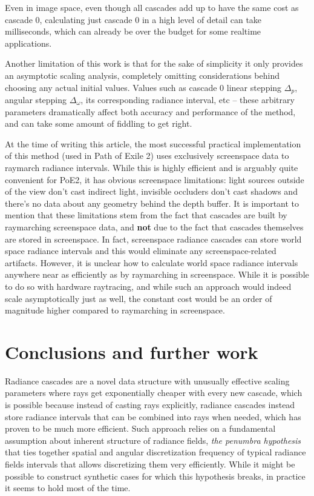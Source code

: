 \documentclass{jcgt}
\begin{document}
Even in image space, even though all cascades add up to have the same cost as cascade 0, calculating just cascade 0 in a high level of detail can take milliseconds, which can already be over the budget for some realtime applications.

Another limitation of this work is that for the sake of simplicity it only provides an asymptotic scaling analysis, completely omitting considerations behind choosing any actual initial values. Values such as cascade 0 linear stepping $\Delta_p$, angular stepping $\Delta_\omega$, its corresponding radiance interval, etc -- these arbitrary parameters dramatically affect both accuracy and performance of the method, and can take some amount of fiddling to get right.

At the time of writing this article, the most successful practical implementation of this method (used in Path of Exile 2) uses exclusively screenspace data to raymarch radiance intervals. While this is highly efficient and is arguably quite convenient for PoE2, it has obvious screenspace limitations: light sources outside of the view don't cast indirect light, invisible occluders don't cast shadows and there's no data about any geometry behind the depth buffer. It is important to mention that these limitations stem from the fact that cascades are built by raymarching screenspace data, and \textbf{not} due to the fact that cascades themselves are stored in screenspace. In fact, screenspace radiance cascades can store world space radiance intervals and this would eliminate any screenspace-related artifacts. However, it is unclear how to calculate world space radiance intervals anywhere near as efficiently as by raymarching in screenspace. While it is possible to do so with hardware raytracing, and while such an approach would indeed scale asymptotically just as well, the constant cost would be an order of magnitude higher compared to raymarching in screenspace.


\section{Conclusions and further work}
Radiance cascades are a novel data structure with unusually effective scaling parameters where rays get exponentially cheaper with every new cascade, which is possible because instead of casting rays explicitly, radiance cascades instead store radiance intervals that can be combined into rays when needed, which has proven to be much more efficient. Such approach relies on a fundamental assumption about inherent structure of radiance fields, \emph{the penumbra hypothesis} that ties together spatial and angular discretization frequency of typical radiance fields intervals that allows discretizing them very efficiently. While it might be possible to construct synthetic cases for which this hypothesis breaks, in practice it seems to hold most of the time.
\end{document}
